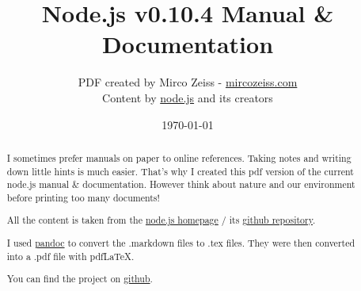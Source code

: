 \documentclass[10pt, a4paper, titlepage, oneside, plain]{article}
\begin{document}
	\title{Node.js v0.10.4 Manual \& Documentation}
	\author{PDF created by Mirco Zeiss - \href{http://mircozeiss.com}{mircozeiss.com}\\Content by \href{http://www.nodejs.org}{node.js} and its creators}
	\date{\today}

	\maketitle

	\begin{abstract}
	I sometimes prefer manuals on paper to online references. Taking notes and writing down little hints is much easier. That's why I created this pdf version of the current node.js manual \& documentation. However think about nature and our environment before printing too many documents!

	All the content is taken from the \href{http://www.nodejs.org}{node.js homepage} / its \href{https://github.com/joyent/node}{github repository}.

	I used \href{http://johnmacfarlane.net/pandoc/}{pandoc} to convert the .markdown files to .tex files. They were then converted into a .pdf file with pdfLaTeX.

	You can find the project on \href{https://github.com/zeMirco/nodejs-pdf-docs}{github}.
	\end{abstract}

	\tableofcontents

	
	
	
	
	
	
					
	
	
	
	
	
				
	
	
	
	
	
	
	
	
	
	
	
	
	
\end{document}
